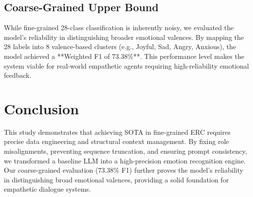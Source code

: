 \documentclass[11pt]{article}
\begin{document}
\subsection{Coarse-Grained Upper Bound}
While fine-grained 28-class classification is inherently noisy, we evaluated the model's reliability in distinguishing broader emotional valences. By mapping the 28 labels into 8 valence-based clusters (e.g., Joyful, Sad, Angry, Anxious), the model achieved a **Weighted F1 of 73.38\%**. This performance level makes the system viable for real-world empathetic agents requiring high-reliability emotional feedback.

\section{Conclusion}
This study demonstrates that achieving SOTA in fine-grained ERC requires precise data engineering and structural context management. By fixing role misalignments, preventing sequence truncation, and ensuring prompt consistency, we transformed a baseline LLM into a high-precision emotion recognition engine. Our coarse-grained evaluation (73.38\% F1) further proves the model's reliability in distinguishing broad emotional valences, providing a solid foundation for empathetic dialogue systems.
\end{document}
